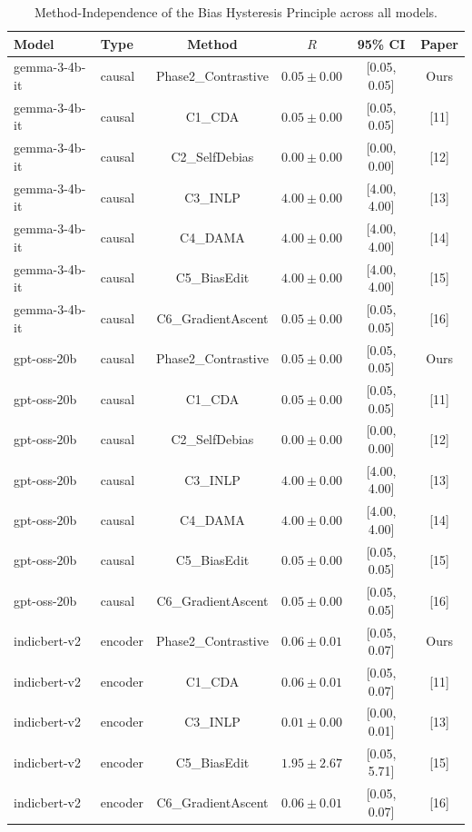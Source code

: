 \begin{table}[t]
\centering
\caption{Method-Independence of the Bias Hysteresis Principle across all models.}
\label{tab:comparative_R}
\begin{tabular}{llcccc}
\toprule
Model & Type & Method & $R$ & 95\% CI & Paper \\
\midrule
  gemma-3-4b-it & causal & Phase2_Contrastive & $0.05 \pm 0.00$ & [0.05, 0.05] & Ours \\
  gemma-3-4b-it & causal & C1_CDA & $0.05 \pm 0.00$ & [0.05, 0.05] & [11] \\
  gemma-3-4b-it & causal & C2_SelfDebias & $0.00 \pm 0.00$ & [0.00, 0.00] & [12] \\
  gemma-3-4b-it & causal & C3_INLP & $4.00 \pm 0.00$ & [4.00, 4.00] & [13] \\
  gemma-3-4b-it & causal & C4_DAMA & $4.00 \pm 0.00$ & [4.00, 4.00] & [14] \\
  gemma-3-4b-it & causal & C5_BiasEdit & $4.00 \pm 0.00$ & [4.00, 4.00] & [15] \\
  gemma-3-4b-it & causal & C6_GradientAscent & $0.05 \pm 0.00$ & [0.05, 0.05] & [16] \\
\midrule
  gpt-oss-20b & causal & Phase2_Contrastive & $0.05 \pm 0.00$ & [0.05, 0.05] & Ours \\
  gpt-oss-20b & causal & C1_CDA & $0.05 \pm 0.00$ & [0.05, 0.05] & [11] \\
  gpt-oss-20b & causal & C2_SelfDebias & $0.00 \pm 0.00$ & [0.00, 0.00] & [12] \\
  gpt-oss-20b & causal & C3_INLP & $4.00 \pm 0.00$ & [4.00, 4.00] & [13] \\
  gpt-oss-20b & causal & C4_DAMA & $4.00 \pm 0.00$ & [4.00, 4.00] & [14] \\
  gpt-oss-20b & causal & C5_BiasEdit & $0.05 \pm 0.00$ & [0.05, 0.05] & [15] \\
  gpt-oss-20b & causal & C6_GradientAscent & $0.05 \pm 0.00$ & [0.05, 0.05] & [16] \\
\midrule
  indicbert-v2 & encoder & Phase2_Contrastive & $0.06 \pm 0.01$ & [0.05, 0.07] & Ours \\
  indicbert-v2 & encoder & C1_CDA & $0.06 \pm 0.01$ & [0.05, 0.07] & [11] \\
  indicbert-v2 & encoder & C3_INLP & $0.01 \pm 0.00$ & [0.00, 0.01] & [13] \\
  indicbert-v2 & encoder & C5_BiasEdit & $1.95 \pm 2.67$ & [0.05, 5.71] & [15] \\
  indicbert-v2 & encoder & C6_GradientAscent & $0.06 \pm 0.01$ & [0.05, 0.07] & [16] \\

\end{tabular}
\end{table}
